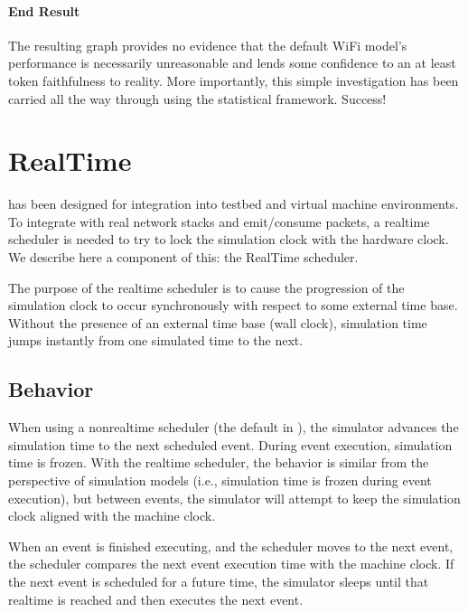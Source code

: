 \documentclass[letterpaper,10pt,english]{sphinxmanual}
\begin{document}
\subsubsection{End Result}
\label{\detokenize{statistics:end-result}}
The resulting graph provides no evidence that the default WiFi model’s performance is necessarily unreasonable and lends some confidence to an at least token faithfulness to reality.  More importantly, this simple investigation has been carried all the way through using the statistical framework.  Success!

\noindent{}


\chapter{RealTime}
\label{\detokenize{realtime:realtime}}\label{\detokenize{realtime::doc}}
 has been designed for integration into testbed and virtual machine
environments. To integrate with real network stacks and emit/consume packets, a
real\sphinxhyphen{}time scheduler is needed to try to lock the simulation clock with the
hardware clock. We describe here a component of this: the RealTime scheduler.

The purpose of the realtime scheduler is to cause the progression of the
simulation clock to occur synchronously with respect to some external time base.
Without the presence of an external time base (wall clock), simulation time
jumps instantly from one simulated time to the next.


\section{Behavior}
\label{\detokenize{realtime:behavior}}
When using a non\sphinxhyphen{}realtime scheduler (the default in ), the simulator
advances the simulation time to the next scheduled event. During event
execution, simulation time is frozen. With the realtime scheduler, the behavior
is similar from the perspective of simulation models (i.e., simulation time is
frozen during event execution), but between events, the simulator will attempt
to keep the simulation clock aligned with the machine clock.

When an event is finished executing, and the scheduler moves to the next event,
the scheduler compares the next event execution time with the machine clock.  If
the next event is scheduled for a future time, the simulator sleeps until that
realtime is reached and then executes the next event.
\end{document}
